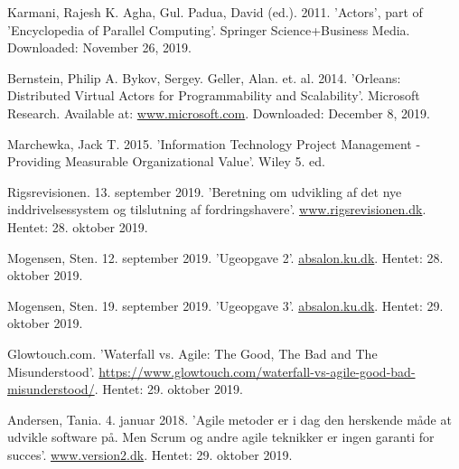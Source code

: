 \begin{thebibliography}{9}
Karmani, Rajesh K. Agha, Gul. Padua, David (ed.). 2011. 'Actors', part of 'Encyclopedia of Parallel Computing'. Springer Science+Business Media. Downloaded: November 26, 2019.

Bernstein, Philip A. Bykov, Sergey. Geller, Alan. et. al. 2014. 'Orleans: Distributed Virtual Actors for Programmability and Scalability'. Microsoft Research. Available at: \url{www.microsoft.com}. Downloaded: December 8, 2019.

Marchewka, Jack T. 2015. 'Information Technology Project Management - Providing Measurable Organizational Value'. Wiley 5. ed.

Rigsrevisionen. 13. september 2019. 'Beretning om udvikling af det nye inddrivelsessystem og tilslutning af fordringshavere'. \url{www.rigsrevisionen.dk}. Hentet: 28. oktober 2019.

Mogensen, Sten. 12. september 2019. 'Ugeopgave 2'. \url{absalon.ku.dk}. Hentet: 28. oktober 2019.

Mogensen, Sten. 19. september 2019. 'Ugeopgave 3'. \url{absalon.ku.dk}. Hentet: 29. oktober 2019.

Glowtouch.com. 'Waterfall vs. Agile: The Good, The Bad and The Misunderstood'. \url{https://www.glowtouch.com/waterfall-vs-agile-good-bad-misunderstood/}. Hentet: 29. oktober 2019.

Andersen, Tania. 4. januar 2018. 'Agile metoder er i dag den herskende måde at udvikle software på. Men Scrum og andre agile teknikker er ingen garanti for succes'. \url{www.version2.dk}. Hentet: 29. oktober 2019.
\end{thebibliography}